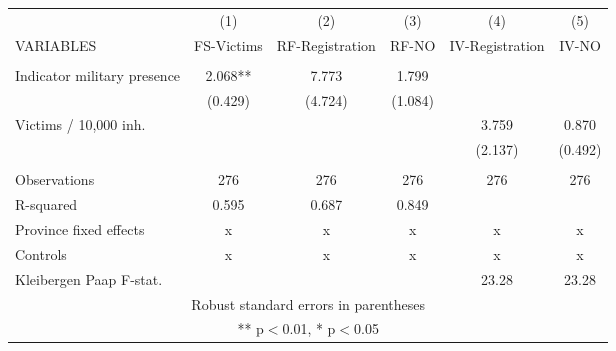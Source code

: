 \begin{tabular}{lccccc} \hline
 & (1) & (2) & (3) & (4) & (5) \\
VARIABLES & FS-Victims & RF-Registration & RF-NO & IV-Registration & IV-NO \\ \hline
 &  &  &  &  &  \\
Indicator military presence & 2.068** & 7.773 & 1.799 &  &  \\
 & (0.429) & (4.724) & (1.084) &  &  \\
Victims / 10,000 inh. &  &  &  & 3.759 & 0.870 \\
 &  &  &  & (2.137) & (0.492) \\
 &  &  &  &  &  \\
Observations & 276 & 276 & 276 & 276 & 276 \\
R-squared & 0.595 & 0.687 & 0.849 &  &  \\
Province fixed effects & x & x & x & x & x \\
Controls & x & x & x & x & x \\
 Kleibergen Paap F-stat. &  &  &  & 23.28 & 23.28 \\ \hline
\multicolumn{6}{c}{ Robust standard errors in parentheses} \\
\multicolumn{6}{c}{ ** p$<$0.01, * p$<$0.05} \\
\end{tabular}
